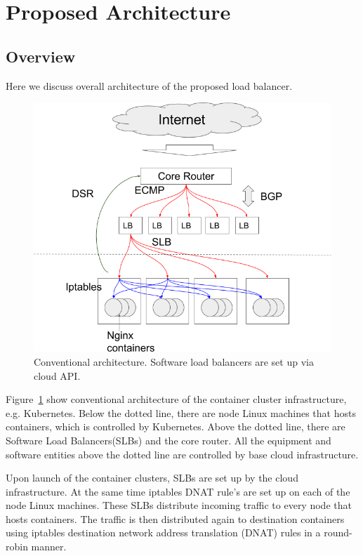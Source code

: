 \section{Proposed Architecture}\label{Architecture}

\subsection{Overview}\label{Network}
Here we discuss overall architecture of the proposed load balancer.
\begin{figure}
\includegraphics[width=\columnwidth]{Figs/google_lb}
\caption{Conventional architecture. Software load balancers are set up via cloud API. }
\label{fig:google_lb}
\end{figure}
Figure~\ref{fig:google_lb} show conventional architecture of the container cluster infrastructure, e.g. Kubernetes.
Below the dotted line, there are node Linux machines that hosts containers, which is controlled by Kubernetes.
Above the dotted line, there are Software Load Balancers(SLBs) and the core router.
All the equipment and software entities above the dotted line are controlled by base cloud infrastructure.

Upon launch of the container clusters, SLBs are set up by the cloud infrastructure.
At the same time iptables DNAT rule's are set up on each of the node Linux machines.
These SLBs distribute incoming traffic to every node that hosts containers.
The traffic is then distributed again to destination containers using iptables destination 
network address translation (DNAT)\cite{MartinA.Brown2017,Marmol2015} rules in a round-robin manner. 

